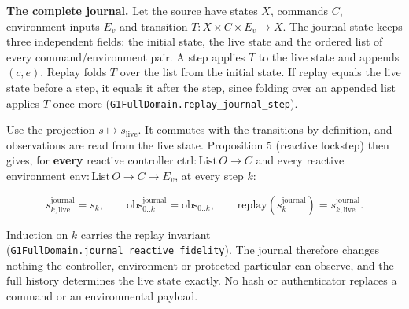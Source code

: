 \documentclass[
]{article}
\begin{document}
\textbf{The complete journal.} Let the source have states \(X\),
commands \(C\), environment inputs \(E_v\) and transition
\(T:X\times C\times E_v\to X\). The journal state keeps three
independent fields: the initial state, the live state and the ordered
list of every
c\allowbreak{}o\allowbreak{}m\allowbreak{}m\allowbreak{}a\allowbreak{}n\allowbreak{}d\allowbreak{}/\allowbreak{}e\allowbreak{}n\allowbreak{}v\allowbreak{}i\allowbreak{}r\allowbreak{}o\allowbreak{}n\allowbreak{}m\allowbreak{}e\allowbreak{}n\allowbreak{}t
pair. A step applies \(T\) to the live state and appends \((c,e)\).
Replay folds \(T\) over the list from the initial state. If replay
equals the live state before a step, it equals it after the step, since
folding over an appended list applies \(T\) once more
(\texttt{G\allowbreak{}1\allowbreak{}F\allowbreak{}u\allowbreak{}l\allowbreak{}l\allowbreak{}D\allowbreak{}o\allowbreak{}m\allowbreak{}a\allowbreak{}i\allowbreak{}n\allowbreak{}.\allowbreak{}r\allowbreak{}e\allowbreak{}p\allowbreak{}l\allowbreak{}a\allowbreak{}y\allowbreak{}\_\allowbreak{}j\allowbreak{}o\allowbreak{}u\allowbreak{}r\allowbreak{}n\allowbreak{}a\allowbreak{}l\allowbreak{}\_\allowbreak{}s\allowbreak{}t\allowbreak{}e\allowbreak{}p}).

Use the projection \(s\mapsto s_{\mathrm{live}}\). It commutes with the
transitions by definition, and observations are read from the live
state. Proposition 5 (reactive lockstep) then gives, for \textbf{every}
reactive controller \(\mathrm{ctrl}:\mathrm{List}\,O\to C\) and every
reactive environment \(\mathrm{env}:\mathrm{List}\,O\to C\to E_v\), at
every step \(k\):

\[
s^{\mathrm{journal}}_{k,\mathrm{live}}=s_k,\qquad
\mathrm{obs}^{\mathrm{journal}}_{0..k}=\mathrm{obs}_{0..k},\qquad
\mathrm{replay}(s^{\mathrm{journal}}_k)=s^{\mathrm{journal}}_{k,\mathrm{live}}.
\]

Induction on \(k\) carries the replay invariant
(\texttt{G\allowbreak{}1\allowbreak{}F\allowbreak{}u\allowbreak{}l\allowbreak{}l\allowbreak{}D\allowbreak{}o\allowbreak{}m\allowbreak{}a\allowbreak{}i\allowbreak{}n\allowbreak{}.\allowbreak{}j\allowbreak{}o\allowbreak{}u\allowbreak{}r\allowbreak{}n\allowbreak{}a\allowbreak{}l\allowbreak{}\_\allowbreak{}r\allowbreak{}e\allowbreak{}a\allowbreak{}c\allowbreak{}t\allowbreak{}i\allowbreak{}v\allowbreak{}e\allowbreak{}\_\allowbreak{}f\allowbreak{}i\allowbreak{}d\allowbreak{}e\allowbreak{}l\allowbreak{}i\allowbreak{}t\allowbreak{}y}).
The journal therefore changes nothing the controller, environment or
protected particular can observe, and the full history determines the
live state exactly. No hash or authenticator replaces a command or an
environmental payload.
\end{document}
